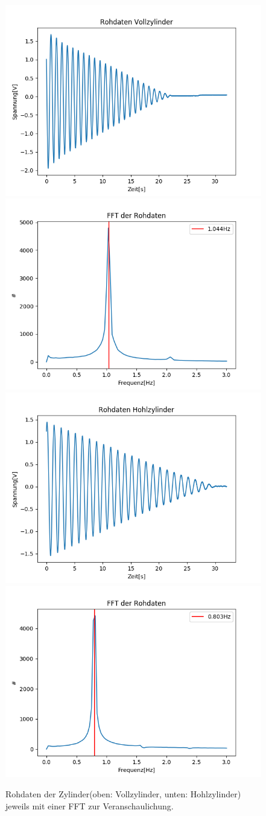 \documentclass[12pt,a4paper]{article}
\begin{document}
\begin{figure}
\includegraphics[width=0.49\linewidth]{Bilder/Voll_Rohdaten.PNG}
\includegraphics[width=0.49\linewidth]{Bilder/Voll_FFT.PNG}
\includegraphics[width=0.49\linewidth]{Bilder/Hohl_Rohdaten.PNG}
\includegraphics[width=0.49\linewidth]{Bilder/Hohl_FFT.PNG}
\caption{Rohdaten der Zylinder(oben: Vollzylinder, unten: Hohlzylinder) jeweils mit einer FFT zur Veranschaulichung.}
\label{fig:Zylinder_Rohdaten}
\end{figure}

\newpage
\end{document}
